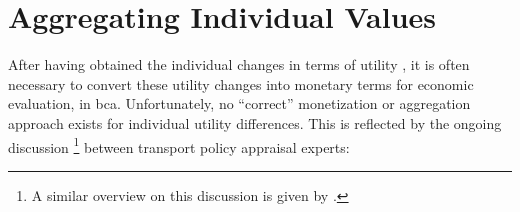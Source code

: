 \section{Aggregating Individual Values}
\label{ch:economicEval:aggregatingValues}
After having obtained the individual changes in terms of utility%
%
%
, it is often necessary to convert these utility changes into monetary terms for economic evaluation, \eg in \gls{bca}.
%
Unfortunately, no ``correct'' monetization or aggregation approach exists for  individual utility differences. This is reflected by the ongoing discussion%
%
\footnote{
%
A similar overview on this discussion is given by 
\citet{BoerjessonEliasson2014SwedishVTTS}.
%
}
%
between transport policy appraisal experts:
%
